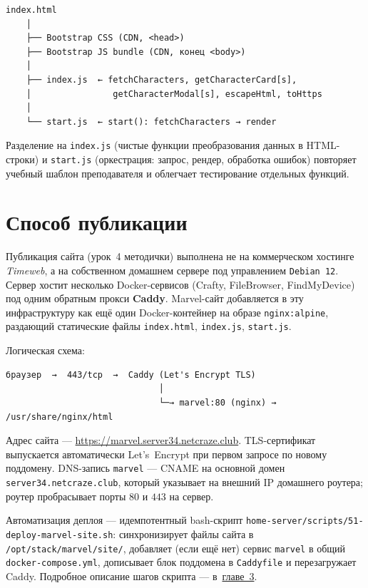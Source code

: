 \begin{lstlisting}[caption={Граф зависимостей файлов},captionpos=b]
index.html
    │
    ├── Bootstrap CSS (CDN, <head>)
    ├── Bootstrap JS bundle (CDN, конец <body>)
    │
    ├── index.js  ← fetchCharacters, getCharacterCard[s],
    │                getCharacterModal[s], escapeHtml, toHttps
    │
    └── start.js  ← start(): fetchCharacters → render
\end{lstlisting}

Разделение на \texttt{index.js} (чистые функции преобразования данных
в HTML-строки) и \texttt{start.js} (оркестрация: запрос, рендер,
обработка ошибок) повторяет учебный шаблон преподавателя и облегчает
тестирование отдельных функций.

\section{Способ публикации}

Публикация сайта (урок~4 методички) выполнена не на коммерческом
хостинге \textit{Timeweb}, а на собственном домашнем сервере под
управлением \texttt{Debian~12}. Сервер хостит несколько Docker-сервисов
(Crafty, FileBrowser, FindMyDevice) под одним обратным прокси
\textbf{Caddy}. Marvel-сайт добавляется в эту инфраструктуру как ещё
один Docker-контейнер на образе \texttt{nginx:alpine}, раздающий
статические файлы \texttt{index.html}, \texttt{index.js},
\texttt{start.js}.

Логическая схема:

\begin{lstlisting}[caption={Маршрут запроса до сайта},captionpos=b]
браузер  →  443/tcp  →  Caddy (Let's Encrypt TLS)
                              │
                              └─→ marvel:80 (nginx) → /usr/share/nginx/html
\end{lstlisting}

Адрес сайта --- \url{https://marvel.server34.netcraze.club}. TLS-сертификат
выпускается автоматически Let's~Encrypt при первом запросе по новому
поддомену. DNS-запись \texttt{marvel} --- CNAME на основной домен
\texttt{server34.netcraze.club}, который указывает на внешний IP
домашнего роутера; роутер пробрасывает порты \(80\) и \(443\) на сервер.

Автоматизация деплоя --- идемпотентный bash-скрипт
\texttt{home-server/scripts/51-deploy-marvel-site.sh}: синхронизирует
файлы сайта в \texttt{/opt/stack/marvel/site/}, добавляет (если ещё нет)
сервис \texttt{marvel} в общий \texttt{docker-compose.yml}, дописывает
блок поддомена в \texttt{Caddyfile} и перезагружает Caddy. Подробное
описание шагов скрипта --- в~\hyperref[ch:practice]{главе~3}.

\endinput
